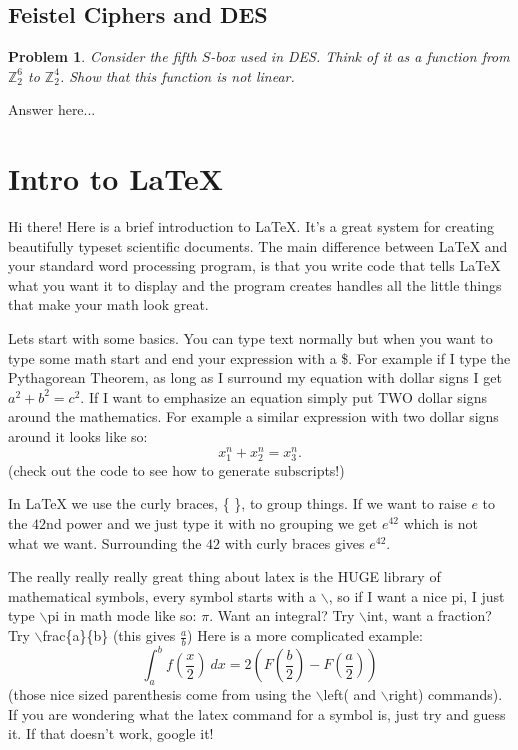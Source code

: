 \documentclass[12pt]{article}
\newenvironment{answer}
    {\begin{adjustwidth}{0pt}{0pt}}
    {\end{adjustwidth}}
\newtheorem{problem}{Problem}
\theoremstyle{remark}  %
\begin{document}
\subsection{Feistel Ciphers and DES}
\setcounter{problem}{0}
    \begin{problem}
        Consider the fifth $S$-box used in DES. Think of it as a function from $\mathbb{Z}_2^6$ to $\mathbb{Z}_2^4$. Show that this function is not linear.
    \end{problem}
    \begin{answer}
        Answer here...
    \end{answer}
\iffalse


\section{Intro to LaTeX}
Hi there! Here is a brief introduction to LaTeX. It's a great system for creating beautifully typeset scientific documents. The main difference between LaTeX and your standard word processing program, is that you write code that tells LaTeX what you want it to display and the program creates handles all the little things that make your math look great.

Lets start with some basics. You can type text normally but when you want to type some math start and end your expression with a \$. For example if I type the Pythagorean Theorem, as long as I surround my equation with dollar signs I get $a^2 +b^2 = c^2$. If I want to emphasize an equation simply put TWO dollar signs around the mathematics. For example a similar expression with two dollar signs around it looks like so: $$x_1^n + x_2^n = x_3^n.$$ (check out the code to see how to generate subscripts!)

In LaTeX we use the curly braces, \{ \}, to group things. If we want to raise $e$ to the $42$nd power and we just type it with no grouping we get $e^42$ which is not what we want. Surrounding the $42$ with curly braces gives $e^{42}$.

The really really really great thing about latex is the HUGE library of mathematical symbols, every symbol starts with a $\backslash$, so if I want a nice pi, I just type $\backslash$pi in math mode like so: $\pi$. Want an integral? Try $\backslash$int, want a fraction? Try $\backslash$frac\{a\}\{b\} (this gives $\frac{a}{b}$) Here is a more complicated example:
$$
\int_a^b f \left(\frac{x}{2} \right) \ dx =2\left( F\left(\frac{b}{2} \right) - F\left(\frac{a}{2}\right) \right)
$$
(those nice sized parenthesis come from using the $\backslash$left( and $\backslash$right) commands). If you are wondering what the latex command for a symbol is, just try and guess it. If that doesn't work, google it!
\end{document}
